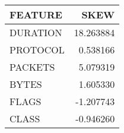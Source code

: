 \begin{tabular}{lr}
\toprule
 FEATURE &      SKEW \\
\midrule
DURATION & 18.263884 \\
PROTOCOL &  0.538166 \\
 PACKETS &  5.079319 \\
   BYTES &  1.605330 \\
   FLAGS & -1.207743 \\
   CLASS & -0.946260 \\
\bottomrule
\end{tabular}
